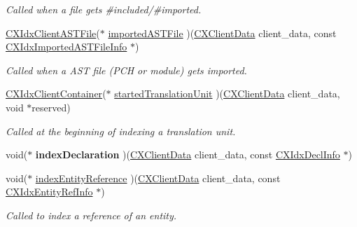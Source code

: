 \begin{DoxyCompactItemize}
\begin{DoxyCompactList}\small\item\em Called when a file gets \#included/\#imported. \end{DoxyCompactList}\item 
\mbox{\hyperlink{group__CINDEX__HIGH_ga802a69b3db636a25c5d434585fce9cbd}{C\+X\+Idx\+Client\+A\+S\+T\+File}}($\ast$ \mbox{\hyperlink{structIndexerCallbacks_a75672a9934f69854080bee3fbc0e3994}{imported\+A\+S\+T\+File}} )(\mbox{\hyperlink{group__CINDEX_gacfa40c3de26d228c0d898403c2c21612}{C\+X\+Client\+Data}} client\+\_\+data, const \mbox{\hyperlink{structCXIdxImportedASTFileInfo}{C\+X\+Idx\+Imported\+A\+S\+T\+File\+Info}} $\ast$)
\begin{DoxyCompactList}\small\item\em Called when a A\+ST file (P\+CH or module) gets imported. \end{DoxyCompactList}\item 
\mbox{\label{structIndexerCallbacks_a11953b566658434afbe6059158a4f8ff}} 
\mbox{\hyperlink{group__CINDEX__HIGH_ga0dac2cb977094bbd9d13b9d8abed278f}{C\+X\+Idx\+Client\+Container}}($\ast$ \mbox{\hyperlink{structIndexerCallbacks_a11953b566658434afbe6059158a4f8ff}{started\+Translation\+Unit}} )(\mbox{\hyperlink{group__CINDEX_gacfa40c3de26d228c0d898403c2c21612}{C\+X\+Client\+Data}} client\+\_\+data, void $\ast$reserved)
\begin{DoxyCompactList}\small\item\em Called at the beginning of indexing a translation unit. \end{DoxyCompactList}\item 
\mbox{\label{structIndexerCallbacks_a322476a55bf770008d678e74f8da2eef}} 
void($\ast$ {\bfseries index\+Declaration} )(\mbox{\hyperlink{group__CINDEX_gacfa40c3de26d228c0d898403c2c21612}{C\+X\+Client\+Data}} client\+\_\+data, const \mbox{\hyperlink{structCXIdxDeclInfo}{C\+X\+Idx\+Decl\+Info}} $\ast$)
\item 
\mbox{\label{structIndexerCallbacks_a6d93809e7743a590beafa0387ac145dc}} 
void($\ast$ \mbox{\hyperlink{structIndexerCallbacks_a6d93809e7743a590beafa0387ac145dc}{index\+Entity\+Reference}} )(\mbox{\hyperlink{group__CINDEX_gacfa40c3de26d228c0d898403c2c21612}{C\+X\+Client\+Data}} client\+\_\+data, const \mbox{\hyperlink{structCXIdxEntityRefInfo}{C\+X\+Idx\+Entity\+Ref\+Info}} $\ast$)
\begin{DoxyCompactList}\small\item\em Called to index a reference of an entity. \end{DoxyCompactList}\end{DoxyCompactItemize}


